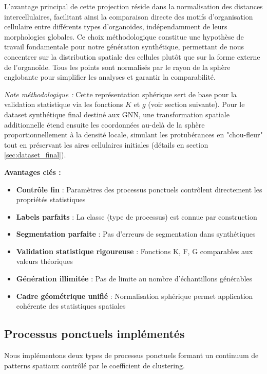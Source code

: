 L'avantage principal de cette projection réside dans la normalisation des distances intercellulaires, facilitant ainsi la comparaison directe des motifs d'organisation cellulaire entre différents types d'organoïdes, indépendamment de leurs morphologies globales. Ce choix méthodologique constitue une hypothèse de travail fondamentale pour notre génération synthétique, permettant de nous concentrer sur la distribution spatiale des cellules plutôt que sur la forme externe de l'organoïde. Tous les points sont normalisés par le rayon de la sphère englobante pour simplifier les analyses et garantir la comparabilité.

\textit{Note méthodologique :} Cette représentation sphérique sert de base pour la validation statistique via les fonctions $K$ et $g$ (voir section suivante). Pour le dataset synthétique final destiné aux GNN, une transformation spatiale additionnelle étend ensuite les coordonnées au-delà de la sphère proportionnellement à la densité locale, simulant les protubérances en "chou-fleur" tout en préservant les aires cellulaires initiales (détails en section \ref{sec:dataset_final}).

\textbf{Avantages clés :}
\begin{itemize}
    \item \textbf{Contrôle fin} : Paramètres des processus ponctuels contrôlent directement les propriétés statistiques
    \item \textbf{Labels parfaits} : La classe (type de processus) est connue par construction
    \item \textbf{Segmentation parfaite} : Pas d'erreurs de segmentation dans synthétiques
    \item \textbf{Validation statistique rigoureuse} : Fonctions K, F, G comparables aux valeurs théoriques
    \item \textbf{Génération illimitée} : Pas de limite au nombre d'échantillons générables
    \item \textbf{Cadre géométrique unifié} : Normalisation sphérique permet application cohérente des statistiques spatiales
\end{itemize}

\subsection{Processus ponctuels implémentés}

Nous implémentons deux types de processus ponctuels formant un continuum de patterns spatiaux contrôlé par le coefficient de clustering.


